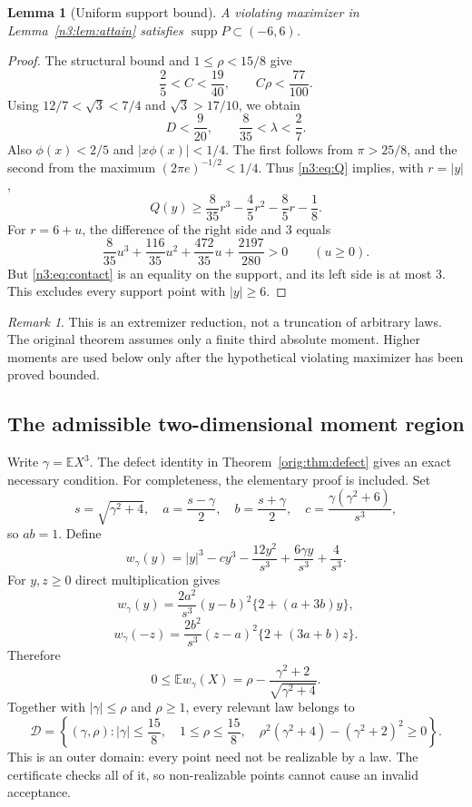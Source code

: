 \documentclass[11pt,a4paper]{article}
\numberwithin{equation}{section}
\newtheorem{lemma}[theorem]{Lemma}
\theoremstyle{definition}
\theoremstyle{remark}
\newtheorem{remark}[theorem]{Remark}
\newcommand{\E}{\mathbb E}
\DeclareMathOperator{\supp}{supp}
\begin{document}
\begin{lemma}[Uniform support bound]\label{n3:lem:support}
A violating maximizer in Lemma~\ref{n3:lem:attain} satisfies
$\supp P\subset(-6,6)$.
\end{lemma}
\begin{proof}
The structural bound and $1\le\rho<15/8$ give
\[
 \frac25<C<\frac{19}{40},\qquad C\rho<\frac{77}{100}.
\]
Using $12/7<\sqrt3<7/4$ and $\sqrt3>17/10$, we obtain
\[
 D<\frac9{20},\qquad \frac8{35}<\lambda<\frac27.
\]
Also $\phi(x)<2/5$ and $|x\phi(x)|<1/4$. The first follows from
$\pi>25/8$, and the second from the maximum
$(2\pi e)^{-1/2}<1/4$. Thus \eqref{n3:eq:Q} implies, with $r=|y|$,
\[
 Q(y)\ge\frac8{35}r^3-\frac45r^2-\frac85r-\frac18.
\]
For $r=6+u$, the difference of the right side and $3$ equals
\[
 \frac8{35}u^3+\frac{116}{35}u^2+\frac{472}{35}u+
 \frac{2197}{280}>0\qquad(u\ge0).
\]
But \eqref{n3:eq:contact} is an equality on the support, and its left side is
at most $3$. This excludes every support point with $|y|\ge6$.
\end{proof}
\begin{remark}
This is an extremizer reduction, not a truncation of arbitrary laws.
The original theorem assumes only a finite third absolute moment.
Higher moments are used below only after the hypothetical violating
maximizer has been proved bounded.
\end{remark}

\subsection{The admissible two-dimensional moment region}
Write $\gamma=\E X^3$. The defect identity in
Theorem~\ref{orig:thm:defect} gives an exact necessary condition. For completeness,
the elementary proof is included.
Set
\[
 s=\sqrt{\gamma^2+4},\quad a=\frac{s-\gamma}{2},\quad
 b=\frac{s+\gamma}{2},\quad c=\frac{\gamma(\gamma^2+6)}{s^3},
\]
so $ab=1$. Define
\[
 w_\gamma(y)=|y|^3-cy^3-\frac{12y^2}{s^3}
             +\frac{6\gamma y}{s^3}+\frac4{s^3}.
\]
For $y,z\ge0$ direct multiplication gives
\[
 w_\gamma(y)=\frac{2a^2}{s^3}(y-b)^2\{2+(a+3b)y\},
\]
\[
 w_\gamma(-z)=\frac{2b^2}{s^3}(z-a)^2\{2+(3a+b)z\}.
\]
Therefore
\[
 0\le\E w_\gamma(X)=\rho-\frac{\gamma^2+2}{\sqrt{\gamma^2+4}}.
\]
Together with $|\gamma|\le\rho$ and $\rho\ge1$, every relevant law belongs to
\begin{equation}\label{n3:eq:momdomain}
 \mathcal D=\left\{(\gamma,\rho):
 |\gamma|\le\frac{15}{8},\quad1\le\rho\le\frac{15}{8},\quad
 \rho^2(\gamma^2+4)-(\gamma^2+2)^2\ge0\right\}.
\end{equation}
This is an outer domain: every point need not be realizable by a law.
The certificate checks all of it, so non-realizable points cannot cause
an invalid acceptance.
\end{document}
